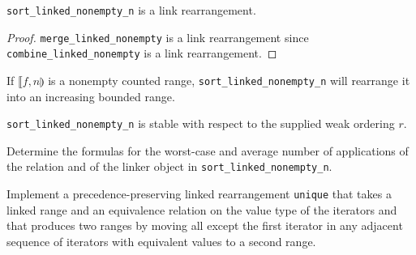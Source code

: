 \begin{lemma}
	\verb|sort_linked_nonempty_n| is a link rearrangement.
\end{lemma}

\begin{proof}
	\verb|merge_linked_nonempty| is a link rearrangement since \verb|combine_linked_nonempty| is a link
	rearrangement.
\end{proof}

\begin{lemma}
	If $\llbracket f, n \rrparenthesis$ is a nonempty counted range, \verb|sort_linked_nonempty_n| will
	rearrange it into an increasing bounded range.
\end{lemma}

\begin{lemma}
	\verb|sort_linked_nonempty_n| is stable with respect to the supplied weak ordering $r$.
\end{lemma}

\begin{exercise}
	Determine the formulas for the worst-case and average number of applications of the relation and of the
	linker object in \verb|sort_linked_nonempty_n|.
\end{exercise}

\begin{exercise}
	Implement a precedence-preserving linked rearrangement \verb|unique| that takes a linked range and an
	equivalence relation on the value type of the iterators and that produces two ranges by moving all except
	the first iterator in any adjacent sequence of iterators with equivalent values to a second range.
\end{exercise}
